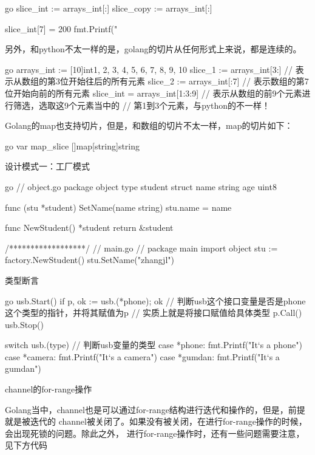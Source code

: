 \begin{outline}[enumerate]
\begin{code-block}{go}
slice_int := arrays_int[:]
slice_copy := arrays_int[:]

slice_int[7] = 200
fmt.Printf("%
\end{code-block}

  另外，和python不太一样的是，golang的切片从任何形式上来说，都是连续的。
\begin{code-block}{go}
arrays_int := [10]int{1, 2, 3, 4, 5, 6, 7, 8, 9, 10}
slice_1 := arrays_int[3:] // 表示从数组的第3位开始往后的所有元素
slice_2 := arrays_int[:7] // 表示数组的第7位开始向前的所有元素
slice_int = arrays_int[1:3:9] // 表示从数组的前9个元素进行筛选，选取这9个元素当中的
                              // 第1到3个元素，与python的不一样！
\end{code-block}

  Golang的map也支持切片，但是，和数组的切片不太一样，map的切片如下：
\begin{code-block}{go}
var map_slice []map[string]string
\end{code-block}

  \1 设计模式一：工厂模式

\begin{code-block}{go}
// object.go
package object
type student struct {
    name string
    age  uint8
}

func (stu *student) SetName(name string) {
    stu.name = name
}

func NewStudent() *student {
    return &student{}
}

/******************/
// main.go
// package main
import object
stu := factory.NewStudent()
stu.SetName("zhangjl")
\end{code-block}

  \1 类型断言

\begin{code-block}{go}
usb.Start()
if p, ok := usb.(*phone); ok { // 判断usb这个接口变量是否是phone这个类型的指针，并将其赋值为p
                               // 实质上就是将接口赋值给具体类型
    p.Call()
}
usb.Stop()

switch usb.(type) { // 判断usb变量的类型
case *phone:
    fmt.Printf("It`s a phone\n")
case *camera:
    fmt.Printf("It`s a camera\n")
case *gumdan:
    fmt.Printf("It`s a gumdan\n")
}
\end{code-block}

  \1 channel的for-range操作

  Golang当中，channel也是可以通过for-range结构进行迭代和操作的，但是，前提就是被迭代的
  channel被关闭了。如果没有被关闭，在进行for-range操作的时候，会出现死锁的问题。除此之外，
  进行for-range操作时，还有一些问题需要注意，见下方代码


\end{outline}
